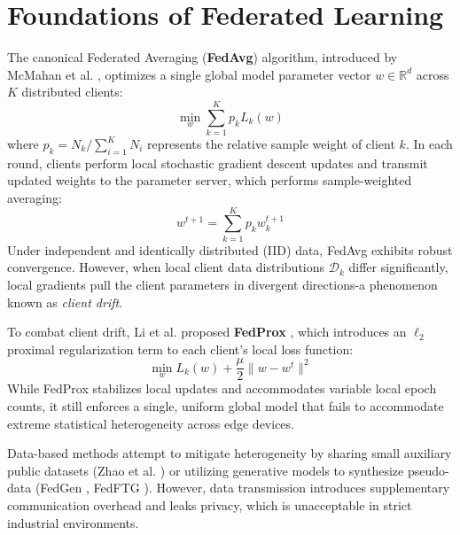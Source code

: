 \documentclass[12pt,a4paper]{report}
\begin{document}
\section{Foundations of Federated Learning}
The canonical Federated Averaging (\textbf{FedAvg}) algorithm, introduced by McMahan et al. \cite{ref_mcmahan_fedavg}, optimizes a single global model parameter vector $w \in \mathbb{R}^d$ across $K$ distributed clients:
\begin{equation}
    \min_{w} \sum_{k=1}^K p_k L_k(w)
\end{equation}
where $p_k = N_k / \sum_{i=1}^K N_i$ represents the relative sample weight of client $k$. In each round, clients perform local stochastic gradient descent updates and transmit updated weights to the parameter server, which performs sample-weighted averaging:
\begin{equation}
    w^{t+1} = \sum_{k=1}^K p_k w_k^{t+1}
\end{equation}
Under independent and identically distributed (IID) data, FedAvg exhibits robust convergence. However, when local client data distributions $\mathcal{D}_k$ differ significantly, local gradients pull the client parameters in divergent directions-a phenomenon known as \textit{client drift}.

To combat client drift, Li et al. proposed \textbf{FedProx} \cite{ref_li_fedprox}, which introduces an $\ell_2$ proximal regularization term to each client's local loss function:
\begin{equation}
    \min_{w} L_k(w) + \frac{\mu}{2}\|w - w^t\|^2
\end{equation}
While FedProx stabilizes local updates and accommodates variable local epoch counts, it still enforces a single, uniform global model that fails to accommodate extreme statistical heterogeneity across edge devices.

Data-based methods attempt to mitigate heterogeneity by sharing small auxiliary public datasets (Zhao et al. \cite{ref_zhao_datasharing}) or utilizing generative models to synthesize pseudo-data (FedGen \cite{ref_fedgen}, FedFTG \cite{ref_fedftg}). However, data transmission introduces supplementary communication overhead and leaks privacy, which is unacceptable in strict industrial environments.
\end{document}
